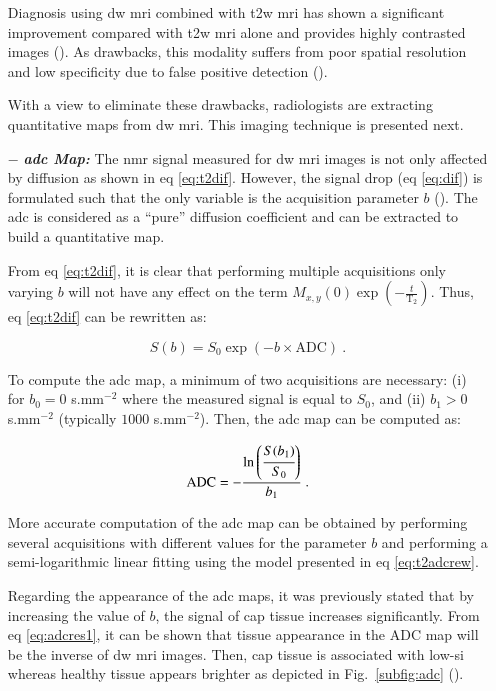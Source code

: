 \begin{enumerate}[leftmargin=*]
Diagnosis using \ac{dw} \ac{mri} combined with \ac{t2w} \ac{mri} has shown a significant improvement compared with \ac{t2w} \ac{mri} alone and provides highly contrasted images (\cite{Shimofusa2005,Padhani2011,Choi2007}). As drawbacks, this modality suffers from poor spatial resolution and low specificity due to false positive detection (\cite{Choi2007}).

With a view to eliminate these drawbacks, radiologists are extracting quantitative maps from \ac{dw} \ac{mri}. This imaging technique is presented next.

\item[$-$] \textbf{\textit{\ac{adc} Map:}} The \ac{nmr} signal measured for \ac{dw} \ac{mri} images is not only affected by diffusion as shown in \acs{eq} \eqref{eq:t2dif}. However, the signal drop (\acs{eq} \eqref{eq:dif}) is formulated such that the only variable is the acquisition parameter $b$ (\cite{LeBihan1986}). The \ac{adc} is considered as a ``pure'' diffusion coefficient and can be extracted to build a quantitative map.

From \acs{eq} \ref{eq:t2dif}, it is clear that performing multiple acquisitions only varying $b$ will not have any effect on the term  $M_{x,y}(0) \exp \left( - \frac{t}{\text{T}_2} \right)$. Thus, \acs{eq} \ref{eq:t2dif} can be rewritten as:

\begin{equation}
	S(b) = S_0 \exp \left( -b \times \text{ADC} \right) \ .
	\label{eq:t2adcrew}
\end{equation}

To compute the \ac{adc} map, a minimum of two acquisitions are necessary: (i) for $b_0=0$ s.mm$^{-2}$ where the measured signal is equal to $S_0$, and (ii) $b_1>0$ s.mm$^{-2}$ (typically $1000$ s.mm$^{-2}$). Then, the \ac{adc} map can be computed as:

\begin{equation}
	\text{ADC} = - \frac{\ln \left( \cfrac{S(b_1)}{S_0} \right) }{b_1} \ .
	\label{eq:adcres1}
\end{equation}

More accurate computation of the \ac{adc} map can be obtained by performing several acquisitions with different values for the parameter $b$ and performing a semi-logarithmic linear fitting using the model presented in \acs{eq} \eqref{eq:t2adcrew}.

Regarding the appearance of the \ac{adc} maps, it was previously stated that by increasing the value of $b$, the signal of \ac{cap} tissue increases significantly. From \acs{eq} \eqref{eq:adcres1}, it can be shown that tissue appearance in the ADC map will be the inverse of \ac{dw} \ac{mri} images. Then, \ac{cap} tissue is associated with low-\ac{si} whereas healthy tissue appears brighter as depicted in Fig.~\ref{subfig:adc} (\cite{Barentsz2012}).


\end{enumerate}
